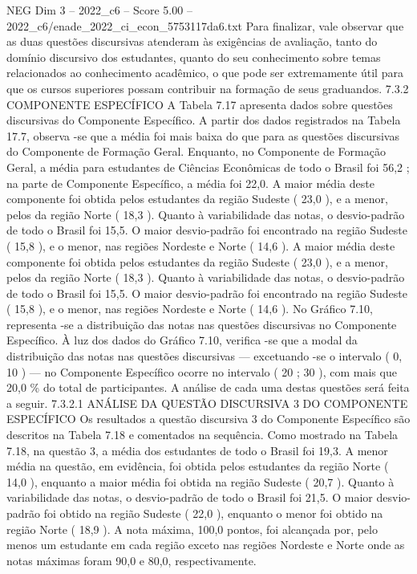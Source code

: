 \begin{textsample}{NEG Dim 3 – 2022\_c6 – Score 5.00 – 2022\_c6/enade\_2022\_ci\_econ\_5753117da6.txt}
Para finalizar, vale observar que as duas questões discursivas atenderam às exigências de avaliação, tanto do domínio discursivo dos estudantes, quanto do seu conhecimento sobre temas relacionados ao conhecimento acadêmico, o que pode ser extremamente útil para que os cursos superiores possam contribuir na formação de seus graduandos. 7.3.2 COMPONENTE ESPECÍFICO A Tabela 7.17 apresenta dados sobre questões discursivas do Componente Específico.
A partir dos dados registrados na Tabela 17.7, observa -se que a média foi mais baixa do que para as questões discursivas do Componente de Formação Geral.
Enquanto, no Componente de Formação Geral, a média para estudantes de Ciências Econômicas de todo o Brasil foi 56,2 ; na parte de Componente Específico, a média foi 22,0.
A maior média deste componente foi obtida pelos estudantes da região Sudeste ( 23,0 ), e a menor, pelos da região Norte ( 18,3 ).
Quanto à variabilidade das notas, o desvio-padrão de todo o Brasil foi 15,5.
O maior desvio-padrão foi encontrado na região Sudeste ( 15,8 ), e o menor, nas regiões Nordeste e Norte ( 14,6 ).
A maior média deste componente foi obtida pelos estudantes da região Sudeste ( 23,0 ), e a menor, pelos da região Norte ( 18,3 ).
Quanto à variabilidade das notas, o desvio-padrão de todo o Brasil foi 15,5.
O maior desvio-padrão foi encontrado na região Sudeste ( 15,8 ), e o menor, nas regiões Nordeste e Norte ( 14,6 ).
No Gráfico 7.10, representa -se a distribuição das notas nas questões discursivas no Componente Específico.
À luz dos dados do Gráfico 7.10, verifica -se que a modal da distribuição das notas nas questões discursivas — excetuando -se o intervalo ( 0, 10 ) — no Componente Específico ocorre no intervalo ( 20 ; 30 ), com mais que 20,0 \% do total de participantes.
A análise de cada uma destas questões será feita a seguir. 7.3.2.1 ANÁLISE DA QUESTÃO DISCURSIVA 3 DO COMPONENTE ESPECÍFICO Os resultados a questão discursiva 3 do Componente Específico são descritos na Tabela 7.18 e comentados na sequência.
Como mostrado na Tabela 7.18, na questão 3, a média dos estudantes de todo o Brasil foi 19,3.
A menor média na questão, em evidência, foi obtida pelos estudantes da região Norte ( 14,0 ), enquanto a maior média foi obtida na região Sudeste ( 20,7 ).
Quanto à variabilidade das notas, o desvio-padrão de todo o Brasil foi 21,5.
O maior desvio-padrão foi obtido na região Sudeste ( 22,0 ), enquanto o menor foi obtido na região Norte ( 18,9 ).
A nota máxima, 100,0 pontos, foi alcançada por, pelo menos um estudante em cada região exceto nas regiões Nordeste e Norte onde as notas máximas foram 90,0 e 80,0, respectivamente.

\end{textsample}

